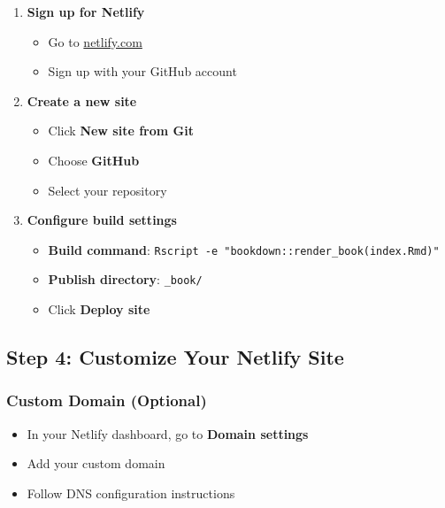 \documentclass[
]{book}
\providecommand{\tightlist}{%
  \setlength{\itemsep}{0pt}\setlength{\parskip}{0pt}}
\begin{document}
\begin{enumerate}
\def\labelenumi{\arabic{enumi}.}
\tightlist
\item
  \textbf{Sign up for Netlify}

  \begin{itemize}
  \tightlist
  \item
    Go to \href{https://netlify.com}{netlify.com}
  \item
    Sign up with your GitHub account
  \end{itemize}
\item
  \textbf{Create a new site}

  \begin{itemize}
  \tightlist
  \item
    Click \textbf{New site from Git}
  \item
    Choose \textbf{GitHub}
  \item
    Select your repository
  \end{itemize}
\item
  \textbf{Configure build settings}

  \begin{itemize}
  \tightlist
  \item
    \textbf{Build command}: \texttt{Rscript\ -e\ "bookdown::render\_book(\textquotesingle{}index.Rmd\textquotesingle{})"}
  \item
    \textbf{Publish directory}: \texttt{\_book/}
  \item
    Click \textbf{Deploy site}
  \end{itemize}
\end{enumerate}

\subsection{Step 4: Customize Your Netlify Site}\label{step-4-customize-your-netlify-site}

\subsubsection{Custom Domain (Optional)}\label{custom-domain-optional}

\begin{itemize}
\tightlist
\item
  In your Netlify dashboard, go to \textbf{Domain settings}
\item
  Add your custom domain
\item
  Follow DNS configuration instructions
\end{itemize}
\end{document}
